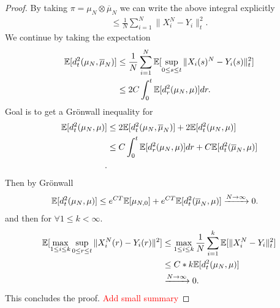 \begin{proof}
  By taking $\pi  = \mu_N \otimes \overline{\mu }_N $ we can write the above integral explicitly 
  \begin{align*}
    \le \frac{1}{N} \sum_{i=1}^{N} \|X^{N}_i - Y_i \|_t^2 
  .\end{align*}
  We continue by taking the expectation
  \begin{align*}
    \mathbb{E}[d_t^2(\mu_N,\overline{\mu }_N )] &\le  \frac{1}{N} \sum_{i=1}^{N} \mathbb{E}[\sup_{0\le s \le t} \|X_i(s)^{N} - Y_i(s) \|_t^2] \\
                                        &\le 2C\int_0^{t} \mathbb{E}[d_r^2(\mu_N,\mu )] dr 
  .\end{align*}
  Goal is to get a Grönwall inequality for 
  \begin{align*}
    \mathbb{E}[d_t^2(\mu_N,\mu )] &\le  2 \mathbb{E}[d_t^2(\mu_N,\overline{\mu }_N )] + 2 \mathbb{E}[d_t^2(\mu_N,\mu )]\\
                          &\le  C \int_0^{t} \mathbb{E}[d_r^2(\mu_N,\mu )] dr + C\mathbb{E}[d_t^2(\overline{\mu}_N,\mu )] \\
  .\end{align*}
  Then by Grönwall 
  \begin{align*}
    \mathbb{E}[d_t^2(\mu_N,\mu )] &\le e^{CT} \mathbb{E}[\mu_{N,0}] + e^{CT} \mathbb{E}[d_t^2(\overline{\mu }_N,\mu  )] \xrightarrow{N\to \infty} 0 
  .\end{align*}
  and then for $\forall  1\le k < \infty$. 
  \begin{align*}
    \mathbb{E}[\max_{1\le i \le  k}\sup_{0\le r\le t} \|X_i^{N}(r) - Y_i(r) \|^2] &\le \max_{1 \le i\le k} \frac{1}{N}\sum_{i=1}^{k} \mathbb{E}[\|X_i^{N}-Y_i \|_t^2] \\
                                                                          &\le  C*k\mathbb{E}[d_t^2(\mu_N,\mu   )]\\
                                                                          &\xrightarrow{N\to \infty} 0
  .\end{align*}
  This concludes the proof. \textcolor{Red}{Add small summary}
\end{proof}
